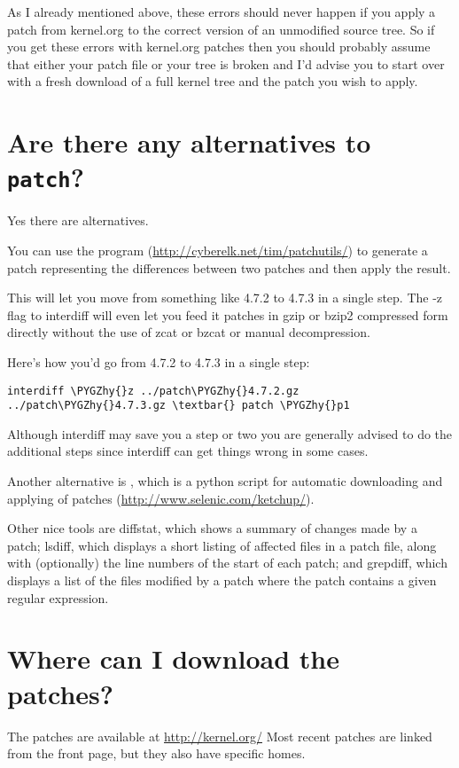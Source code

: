 \documentclass[a4paper,8pt,english]{sphinxmanual}
\def\PYGZhy{\char`\-}
\begin{document}
As I already mentioned above, these errors should never happen if you apply
a patch from kernel.org to the correct version of an unmodified source tree.
So if you get these errors with kernel.org patches then you should probably
assume that either your patch file or your tree is broken and I'd advise you
to start over with a fresh download of a full kernel tree and the patch you
wish to apply.


\section{Are there any alternatives to \texttt{patch}?}
\label{process/applying-patches:are-there-any-alternatives-to-patch}
Yes there are alternatives.

You can use the  program (\href{http://cyberelk.net/tim/patchutils/}{http://cyberelk.net/tim/patchutils/}) to
generate a patch representing the differences between two patches and then
apply the result.

This will let you move from something like 4.7.2 to 4.7.3 in a single
step. The -z flag to interdiff will even let you feed it patches in gzip or
bzip2 compressed form directly without the use of zcat or bzcat or manual
decompression.

Here's how you'd go from 4.7.2 to 4.7.3 in a single step:

\begin{Verbatim}[commandchars=\\\{\}]
interdiff \PYGZhy{}z ../patch\PYGZhy{}4.7.2.gz ../patch\PYGZhy{}4.7.3.gz \textbar{} patch \PYGZhy{}p1
\end{Verbatim}

Although interdiff may save you a step or two you are generally advised to
do the additional steps since interdiff can get things wrong in some cases.

Another alternative is , which is a python script for automatic
downloading and applying of patches (\href{http://www.selenic.com/ketchup/}{http://www.selenic.com/ketchup/}).

Other nice tools are diffstat, which shows a summary of changes made by a
patch; lsdiff, which displays a short listing of affected files in a patch
file, along with (optionally) the line numbers of the start of each patch;
and grepdiff, which displays a list of the files modified by a patch where
the patch contains a given regular expression.


\section{Where can I download the patches?}
\label{process/applying-patches:where-can-i-download-the-patches}
The patches are available at \href{http://kernel.org/}{http://kernel.org/}
Most recent patches are linked from the front page, but they also have
specific homes.
\end{document}
